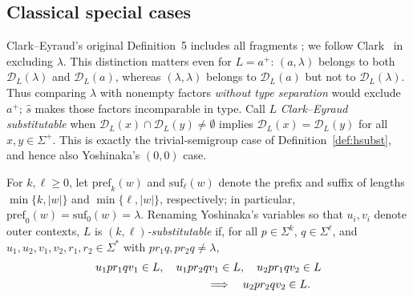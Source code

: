 \documentclass[11pt,a4paper]{article}
\theoremstyle{remark}
\theoremstyle{plain}
\newcommand{\D}{\mathcal{D}}
\newcommand{\pref}{\mathrm{pref}}
\newcommand{\suf}{\mathrm{suf}}
\begin{document}
\subsection{Classical special cases}

Clark--Eyraud's original Definition~5 includes all fragments
\cite{clark-eyraud2007}; we follow Clark~\cite{clark2013}
in excluding $\lambda$.  This distinction matters even for $L=a^+$:
$(a,\lambda)$ belongs to both $\D_L(\lambda)$ and $\D_L(a)$,
whereas $(\lambda,\lambda)$ belongs to $\D_L(a)$ but not to
$\D_L(\lambda)$.  Thus comparing $\lambda$ with nonempty factors
\emph{without type separation} would exclude $a^+$;
$\widehat s$ makes those factors incomparable in type.
Call $L$
\emph{Clark--Eyraud substitutable} when
$\D_L(x)\cap\D_L(y)\ne\emptyset$ implies
$\D_L(x)=\D_L(y)$ for all $x,y\in\Sigma^+$.  This is exactly the
trivial-semigroup case of Definition~\ref{def:hsubst}, and hence also
Yoshinaka's $(0,0)$ case.


For $k,\ell\ge0$, let $\pref_k(w)$ and $\suf_\ell(w)$ denote the
prefix and suffix of lengths $\min\{k,|w|\}$ and
$\min\{\ell,|w|\}$, respectively; in particular,
$\pref_0(w)=\suf_0(w)=\lambda$.  Renaming Yoshinaka's variables so that
$u_i,v_i$ denote outer contexts, \hypertarget{def:kl-subst}{}$L$ is \emph{$(k,\ell)$-substitutable}
if, for all $p\in\Sigma^k$, $q\in\Sigma^\ell$, and
$u_1,u_2,v_1,v_2,r_1,r_2\in\Sigma^*$ with $pr_1q,pr_2q\ne\lambda$,
\[
\begin{split}
&u_1pr_1qv_1\in L,\quad u_1pr_2qv_1\in L,\quad
u_2pr_1qv_2\in L\\
&\hspace{35mm}\Longrightarrow\quad u_2pr_2qv_2\in L.
\end{split}
\]
\end{document}
